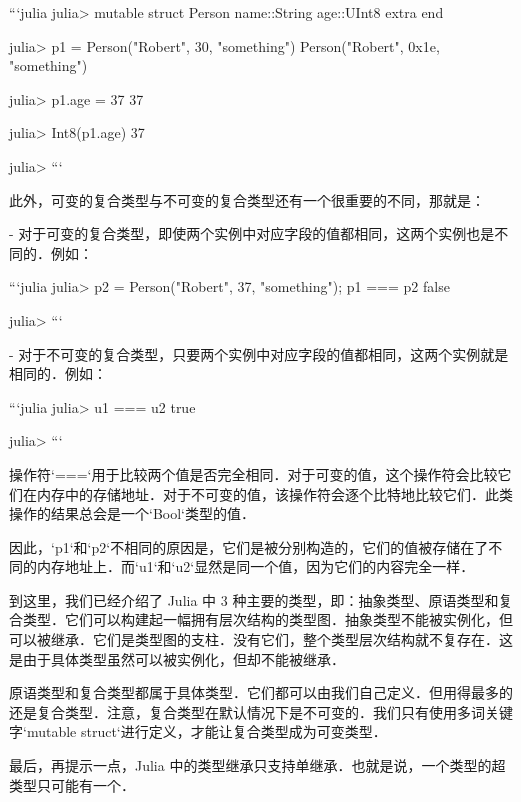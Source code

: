 ```julia
julia> mutable struct Person
           name::String
           age::UInt8
           extra
       end

julia> p1 = Person("Robert", 30, "something")
Person("Robert", 0x1e, "something")

julia> p1.age = 37
37

julia> Int8(p1.age)
37

julia> 
```

此外，可变的复合类型与不可变的复合类型还有一个很重要的不同，那就是：

- 对于可变的复合类型，即使两个实例中对应字段的值都相同，这两个实例也是不同的．例如：

  ```julia
  julia> p2 = Person("Robert", 37, "something"); p1 === p2
  false
  
  julia> 
  ```

- 对于不可变的复合类型，只要两个实例中对应字段的值都相同，这两个实例就是相同的．例如：

  ```julia
  julia> u1 === u2
  true
  
  julia> 
  ```

操作符`===`用于比较两个值是否完全相同．对于可变的值，这个操作符会比较它们在内存中的存储地址．对于不可变的值，该操作符会逐个比特地比较它们．此类操作的结果总会是一个`Bool`类型的值．

因此，`p1`和`p2`不相同的原因是，它们是被分别构造的，它们的值被存储在了不同的内存地址上．而`u1`和`u2`显然是同一个值，因为它们的内容完全一样．

到这里，我们已经介绍了 Julia 中 3 种主要的类型，即：抽象类型、原语类型和复合类型．它们可以构建起一幅拥有层次结构的类型图．抽象类型不能被实例化，但可以被继承．它们是类型图的支柱．没有它们，整个类型层次结构就不复存在．这是由于具体类型虽然可以被实例化，但却不能被继承．

原语类型和复合类型都属于具体类型．它们都可以由我们自己定义．但用得最多的还是复合类型．注意，复合类型在默认情况下是不可变的．我们只有使用多词关键字`mutable struct`进行定义，才能让复合类型成为可变类型．

最后，再提示一点，Julia 中的类型继承只支持单继承．也就是说，一个类型的超类型只可能有一个．